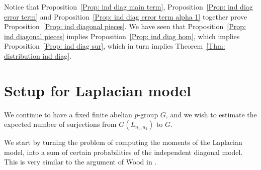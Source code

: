 \documentclass[12pt]{amsart}
\theoremstyle{definition}
\newcommand{\Lnot}{L_{n_1,n_2}}
\begin{document}
Notice that Proposition~\ref{Prop: ind diag main term}, Proposition~\ref{Prop: ind diag error term} and Proposition~\ref{Prop: ind diag error term alpha 1} together prove Proposition~\ref{Prop: ind diagonal pieces}. We have seen that Proposition~\ref{Prop: ind diagonal pieces} implies Proposition~\ref{Prop: ind diag hom}, which implies Proposition~\ref{Prop: ind diag sur}, which in turn implies Theorem~\ref{Thm: distribution ind diag}.























\section{Setup for Laplacian model}\label{Sec: set laplacian dir}


We continue to have a fixed finite abelian $p$-group $G$, and we wish to estimate the expected number of surjections from $G(\Lnot)$ to $G$.

We start by turning the problem of computing the moments of the Laplacian model, into a sum of certain probabilities of the independent diagonal model. This is very similar to the argument of Wood in \cite{wood2017distribution}.
\end{document}
